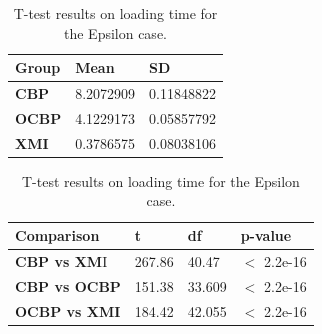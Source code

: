 \documentclass{llncs}
\begin{document}
    \begin{table}[ht]
        \centering
        \label{table:ttest_load_time_epsilon}
        \caption{T-test results on loading time for the Epsilon case.}
        \begin{minipage}{0.44\textwidth}
            \centering
            \begin{tabular}{|p{}|p{}|p{}|}
                \hline 
                \textbf{Group}  & \textbf{Mean} & \textbf{SD} \\ 
                \hline 
                \textbf{CBP} & 8.2072909    & 0.11848822 \\ 
                \hline 
                \textbf{OCBP} &  4.1229173  &  0.05857792 \\ 
                \hline 
                \textbf{XMI} & 0.3786575   & 0.08038106 \\ 
                \hline 
            \end{tabular} 
        \end{minipage}
        \hfill
        \begin{minipage}{0.54\textwidth}
            \centering
            \begin{tabular}{|p{}|p{}|p{}|p{}|}
                \hline 
                \textbf{Comparison} & \textbf{t}  & \textbf{df} & \textbf{p-value} \\ 
                \hline 
                \textbf{CBP vs XM}I & 267.86   &40.47 & $<$ 2.2e-16 \\ 
                \hline 
                \textbf{CBP vs OCBP} & 151.38 & 33.609 & $<$ 2.2e-16 \\ 
                \hline 
                \textbf{OCBP vs XMI} & 184.42    &42.055  & $<$ 2.2e-16 \\ 
                \hline 
            \end{tabular} 
        \end{minipage}
    \end{table}
    
\end{document}
